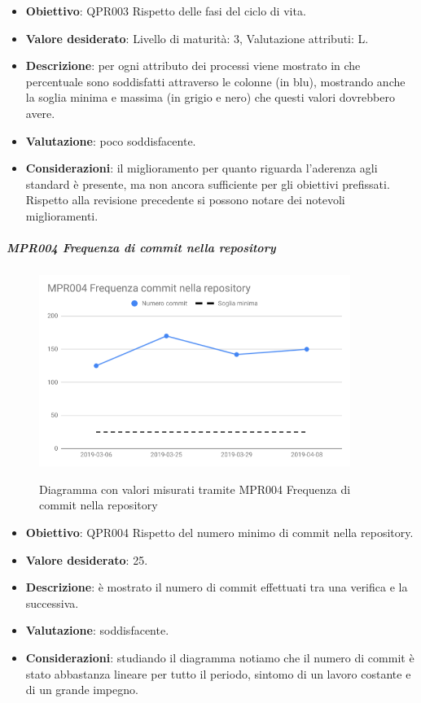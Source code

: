 	\begin{itemize}
		\item \textbf{Obiettivo}: QPR003 Rispetto delle fasi del ciclo di vita.
		\item \textbf{Valore desiderato}: Livello di maturità: 3, Valutazione attributi: L.
		\item \textbf{Descrizione}: per ogni attributo dei processi viene mostrato in che percentuale sono soddisfatti attraverso le colonne (in blu), mostrando anche la soglia minima e massima (in grigio e nero) che questi valori dovrebbero avere.
		\item \textbf{Valutazione}: poco soddisfacente.
		\item \textbf{Considerazioni}: il miglioramento per quanto riguarda l'aderenza agli standard è presente, ma non ancora sufficiente per gli obiettivi prefissati. Rispetto alla revisione precedente
		si possono notare dei notevoli miglioramenti.
	\end{itemize}

	\subparagraph{MPR004 Frequenza di commit nella repository}

	\begin{figure}[H]
		\centering
		\includegraphics[width=0.9\textwidth]{img/cruscotti/RQ/MPR004.png}
		\label{immagineFrequenzaCommitRQ}
		\caption{Diagramma con valori misurati tramite MPR004 Frequenza di commit nella repository}
	\end{figure}

	\begin{itemize}
		\item \textbf{Obiettivo}: QPR004 Rispetto del numero minimo di commit nella repository.
		\item \textbf{Valore desiderato}: 25.
		\item \textbf{Descrizione}: è mostrato il numero di commit effettuati tra una verifica e la successiva.
		\item \textbf{Valutazione}: soddisfacente.
		\item \textbf{Considerazioni}: studiando il diagramma notiamo che il numero di commit è stato
		abbastanza lineare per tutto il periodo, sintomo di un lavoro costante e di un grande impegno.
	\end{itemize}

